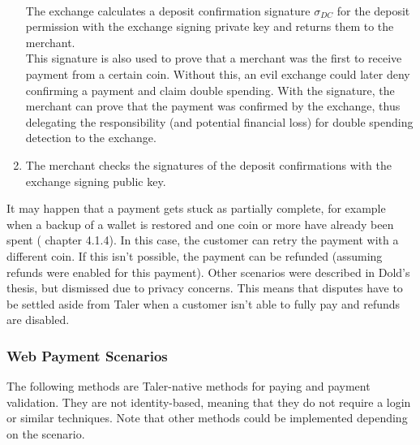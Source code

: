 \begin{enumerate}
          \\The exchange calculates a deposit confirmation signature $ \sigma_{DC} $ for the deposit permission with the exchange signing private key and returns them to the merchant.
          \\This signature is also used to prove that a merchant was the first to receive payment from a certain coin.
          Without this, an evil exchange could later deny confirming a payment and claim double spending.
          With the signature, the merchant can prove that the payment was confirmed by the exchange, thus delegating the responsibility (and potential financial loss) for double spending detection to the exchange.
    \item The merchant checks the signatures of the deposit confirmations with the exchange signing public key.
\end{enumerate}

It may happen that a payment gets stuck as partially complete, for example when a backup of a wallet is restored and one coin or more have already been spent (\cite{dold:the-gnu-taler-system} chapter 4.1.4).
In this case, the customer can retry the payment with a different coin.
If this isn't possible, the payment can be refunded (assuming refunds were enabled for this payment).
Other scenarios were described in Dold's thesis, but dismissed due to privacy concerns.
This means that disputes have to be settled aside from Taler when a customer isn't able to fully pay and refunds are disabled.

\subsubsection{Web Payment Scenarios}
The following methods are Taler-native methods for paying and payment validation.
They are not identity-based, meaning that they do not require a login or similar techniques.
Note that other methods could be implemented depending on the scenario.

